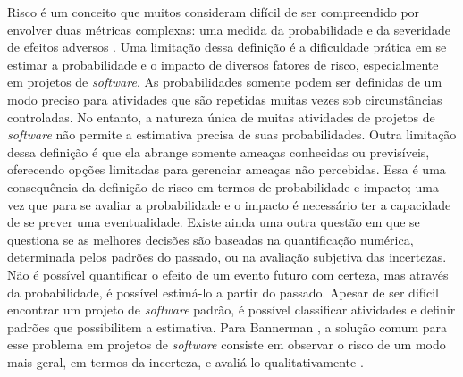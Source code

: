 Risco é um conceito que muitos consideram difícil de ser compreendido por envolver duas métricas complexas: uma medida da probabilidade e da severidade de efeitos adversos \cite{Haimes2009}. Uma limitação dessa definição é a dificuldade prática em se estimar a probabilidade e o impacto de diversos fatores de risco, especialmente em projetos de \textit{software}. As probabilidades somente podem ser definidas de um modo preciso para atividades que são repetidas muitas vezes sob circunstâncias controladas. No entanto, a natureza única de muitas atividades de projetos de \textit{software} não permite a estimativa precisa de suas probabilidades. Outra limitação dessa definição é que ela abrange somente ameaças conhecidas ou previsíveis, oferecendo opções limitadas para gerenciar ameaças não percebidas. Essa é uma consequência da definição de risco em termos de probabilidade e impacto; uma vez que para se avaliar a probabilidade e o impacto é necessário ter a capacidade de se prever uma eventualidade. Existe ainda uma outra questão em que se questiona se as melhores decisões são baseadas na quantificação numérica, determinada pelos padrões do passado, ou na avaliação subjetiva das incertezas. Não é possível quantificar o efeito de um evento futuro com certeza, mas através da probabilidade, é possível estimá-lo a partir do passado. Apesar de ser difícil encontrar um projeto de \textit{software} padrão, é possível classificar atividades e definir padrões que possibilitem a estimativa. Para Bannerman \cite{bannerman2008risk}, a solução comum para esse problema em projetos de \textit{software} consiste em observar o risco de um modo mais geral, em termos da incerteza, e avaliá-lo qualitativamente  \cite{bannerman2008risk}.

